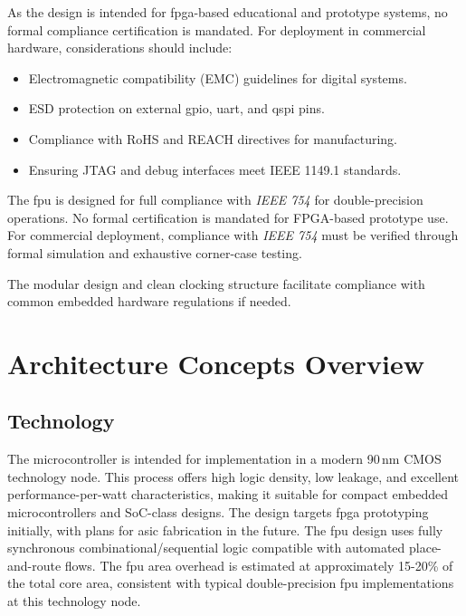 \begin{itemize}
            As the design is intended for \gls{fpga}-based educational and prototype
            systems, no formal compliance certification is mandated. For deployment in
            commercial hardware, considerations should include:
            \begin{itemize}
                  \item Electromagnetic compatibility (EMC) guidelines for digital systems.
                  \item ESD protection on external \gls{gpio}, \gls{uart}, and \gls{qspi} pins.
                  \item Compliance with RoHS and REACH directives for manufacturing.
                  \item Ensuring JTAG and debug interfaces meet IEEE 1149.1 standards.
            \end{itemize}

            The \gls{fpu} is designed for full compliance with \textit{IEEE 754} for
            double-precision operations. No formal certification is mandated for FPGA-based
            prototype use. For commercial deployment, compliance with \textit{IEEE
                  754} must be verified through formal simulation and exhaustive
            corner-case testing.

            The modular design and clean clocking structure facilitate compliance with
            common embedded hardware regulations if needed.

            \section{Architecture Concepts Overview}

            \subsection{Technology}
            The microcontroller is intended for implementation in a modern 90\,nm CMOS
            technology node. This process offers high logic density, low leakage, and
            excellent performance-per-watt characteristics, making it suitable for compact
            embedded microcontrollers and \gls{SoC}-class designs. The design targets
            \gls{fpga} prototyping initially, with plans for \gls{asic} fabrication in the
            future. The \gls{fpu} design uses fully synchronous combinational/sequential
            logic compatible with automated place-and-route flows. The \gls{fpu} area
            overhead is estimated at approximately 15-20\% of the total core area,
            consistent with typical double-precision \gls{fpu} implementations at this
            technology node.


\end{itemize}
